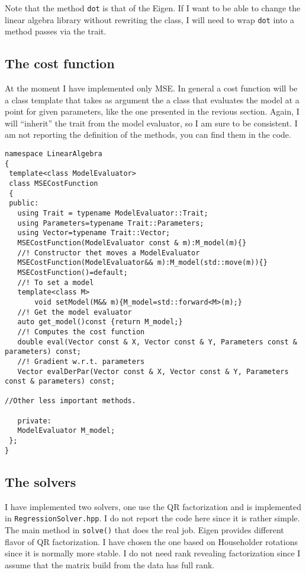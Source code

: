 \documentclass{article}
\newcommand{\li}{\lstinline}
\begin{document}
Note that the method \li!dot! is that of the Eigen. If I want to be able to change the linear algebra library without rewriting the class, I will need to wrap \li!dot! into a method passes via the trait.
\subsection{The cost function}
At the moment I have implemented only MSE. In general a cost function
will be a class template that takes as argument the a class that evaluates the model at a point for given parameters, like the one
presented in the revious section.  Again, I will ``inherit'' the
trait from the model evaluator, so I am sure to be consistent.
I am not reporting the definition of the methods, you can find them in the code.
\begin{lstlisting}[title={MSECostFunction.hpp}]
  namespace LinearAlgebra
{
 template<class ModelEvaluator>
 class MSECostFunction
 {
 public:
   using Trait = typename ModelEvaluator::Trait;
   using Parameters=typename Trait::Parameters;
   using Vector=typename Trait::Vector;
   MSECostFunction(ModelEvaluator const & m):M_model(m){}
   //! Constructor thet moves a ModelEvaluator
   MSECostFunction(ModelEvaluator&& m):M_model(std::move(m)){}
   MSECostFunction()=default;
   //! To set a model
   template<class M>
       void setModel(M&& m){M_model=std::forward<M>(m);}
   //! Get the model evaluator
   auto get_model()const {return M_model;}
   //! Computes the cost function
   double eval(Vector const & X, Vector const & Y, Parameters const & parameters) const;
   //! Gradient w.r.t. parameters
   Vector evalDerPar(Vector const & X, Vector const & Y, Parameters const & parameters) const;

//Other less important methods.
   
   private:
   ModelEvaluator M_model;
 };
}
\end{lstlisting}
\subsection{The solvers}
I have implemented two solvers, one use the QR factorization and is
implemented in \texttt{RegressionSolver.hpp}. I do not report the code
here since it is rather simple. The main method in \li!solve()! that
does the real job. Eigen provides different flavor of QR
factorization. I have chosen the one based on Householder rotations
since it is normally more stable. I do not need rank revealing
factorization since I assume that the matrix build from the data has
full rank.
\end{document}
